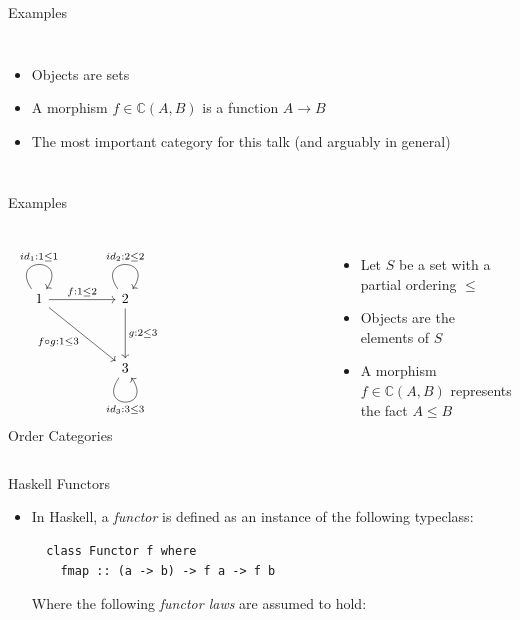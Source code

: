 \documentclass[aspectratio=169]{beamer} %
\newcommand{\bC}{\mathbb{C}}
\begin{document}
{\begin{frame}[fragile]{Examples}
\begin{columns}
\begin{itemize}
 \pause\item Objects are sets
 \pause\item A morphism $f \in \bC(A,B)$ is a function $A \to B$
 \pause\item The most important category for this talk (and arguably in general)
\end{itemize}
\end{columns}
\end{frame}
\begin{frame}[fragile]{Examples}
\begin{columns}
\[\begin{tikzcd}
	1 && 2 \\
	\\
	&& 3 &&&&& {}
	\arrow["{id_1 : 1 \leq 1}", from=1-1, to=1-1, loop, in=55, out=125, distance=10mm]
	\arrow["{f : 1 \leq 2}", from=1-1, to=1-3]
	\arrow["{f \circ g : 1 \leq 3}"', from=1-1, to=3-3]
	\arrow["{id_2 : 2 \leq 2}", from=1-3, to=1-3, loop, in=55, out=125, distance=10mm]
	\arrow["{g : 2 \leq 3}", from=1-3, to=3-3]
	\arrow["{id_3 : 3 \leq 3}"', from=3-3, to=3-3, loop, in=305, out=235, distance=10mm]
\end{tikzcd}\]
Order Categories
\begin{itemize}
 \pause\item Let $S$ be a set with a partial ordering $\leq$
 \pause\item Objects are the elements of $S$
 \pause\item A morphism $f \in \bC(A,B)$ represents the fact $A \leq B$
\end{itemize}
\end{columns}
\end{frame}
%
%
%
\begin{frame}[fragile]{Haskell Functors}
\begin{itemize}
 \item In Haskell, a \textit{functor} is defined as an instance of the following typeclass:
 \pause\begin{verbatim}
  class Functor f where
    fmap :: (a -> b) -> f a -> f b
 \end{verbatim}
 \pause Where the following \textit{functor laws} are assumed to hold:

\end{itemize}
\end{frame}}
\end{document}
